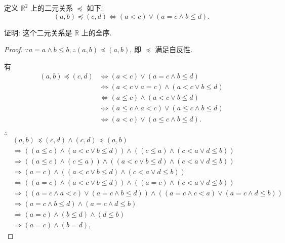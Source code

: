 \documentclass{ctexart}
\begin{document}
\begin{exercisec}[2.4.5]
    定义 $\mathbb{R}^2$ 上的二元关系 $\preceq$ 如下:
    \[(a,b)\preceq(c,d)\Leftrightarrow(a<c)\vee(a=c\wedge b\leq d).\]

    证明: 这个二元关系是 $\mathbb{R}$ 上的全序.
\end{exercisec}
\begin{proof}
    $\because a=a\wedge b\leq b,\therefore(a,b)\preceq(a,b)$, 即 $\preceq$ 满足自反性.
    
    有
    \begin{align*}
        (a,b)\preceq(c,d) & \Leftrightarrow(a<c)\vee(a=c\wedge b\leq d) \\
        & \Leftrightarrow(a<c\vee a=c)\wedge(a<c\vee b\leq d) \\
        & \Leftrightarrow(a\leq c)\wedge(a<c\vee b\leq d) \\
        & \Leftrightarrow(a\leq c\wedge a<c)\vee(a\leq c\wedge b\leq d) \\
        & \Leftrightarrow(a<c)\vee(a\leq c\wedge b\leq d).
    \end{align*}

    $\therefore$
    \begin{align*}
        & (a,b)\preceq(c,d)\wedge(c,d)\preceq(a,b) \\
        & \Rightarrow((a\leq c)\wedge(a<c\vee b\leq d))\wedge((c\leq a)\wedge(c<a\vee d\leq b)) \\
        & \Rightarrow((a\leq c)\wedge(c\leq a))\wedge((a<c\vee b\leq d)\wedge(c<a\vee d\leq b)) \\
        & \Rightarrow(a=c)\wedge((a<c\vee b\leq d)\wedge(c<a\vee d\leq b)) \\
        & \Rightarrow((a=c)\wedge(a<c\vee b\leq d))\wedge((a=c)\wedge(c<a\vee d\leq b)) \\
        & \Rightarrow((a=c\wedge a<c)\vee(a=c\wedge b\leq d))\wedge((a=c\wedge c<a)\vee(a=c\wedge d\leq b)) \\
        & \Rightarrow(a=c\wedge b\leq d)\wedge(a=c\wedge d\leq b) \\
        & \Rightarrow(a=c)\wedge(b\leq d)\wedge(d\leq b) \\
        & \Rightarrow(a=c)\wedge(b=d),
    \end{align*}


\end{proof}
\end{document}
